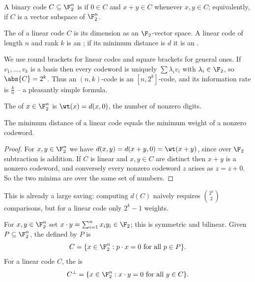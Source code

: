 \begin{definition}
	A binary code $C \subseteq \F_2^n$ is  if $0 \in C$ and $x+y \in C$ whenever $x,y \in C$; equivalently, if $C$ is a vector subspace of $\F_2^n$.
\end{definition}

\begin{definition}[Rank]
	The  of a linear code $C$ is its dimension as an $\F_2$-vector space. A linear code of length $n$ and rank $k$ is an ; if its minimum distance is $d$ it is an .
\end{definition}

We use round brackets for linear codes and square brackets for general ones. If $v_1,\dots,v_k$ is a basis then every codeword is uniquely $\sum \lambda_i v_i$ with $\lambda_i \in \F_2$, so $\abs{C} = 2^k$. Thus an $(n,k)$-code is an $[n,2^k]$-code, and its information rate is $\frac kn$ -- a pleasantly simple formula.

\begin{definition}[Weight]
	The  of $x \in \F_2^n$ is $\wt(x) = d(x,0)$, the number of nonzero digits.
\end{definition}

\begin{lemma}\label{lem:wtmin}
	The minimum distance of a linear code equals the minimum weight of a nonzero codeword.
\end{lemma}

\begin{proof}
	For $x,y \in \F_2^n$ we have $d(x,y) = d(x+y,0) = \wt(x+y)$, since over $\F_2$ subtraction is addition. If $C$ is linear and $x,y \in C$ are distinct then $x+y$ is a nonzero codeword, and conversely every nonzero codeword $z$ arises as $z = z + 0$. So the two minima are over the same set of numbers.
\end{proof}

This is already a large saving: computing $d(C)$ naively requires $\binom{2^k}{2}$ comparisons, but for a linear code only $2^k - 1$ weights.

\begin{definition}
	For $x,y \in \F_2^n$ set $x\cdot y = \sum_{i=1}^n x_iy_i \in \F_2$; this is symmetric and bilinear. Given $P \subseteq \F_2^n$, the  defined by $P$ is
	$$C = \{x \in \F_2^n : p\cdot x = 0 \text{ for all } p \in P\}.$$
	For a linear code $C$, the  is
	$$C^\perp = \{x \in \F_2^n : x\cdot y = 0 \text{ for all } y \in C\}.$$
\end{definition}

